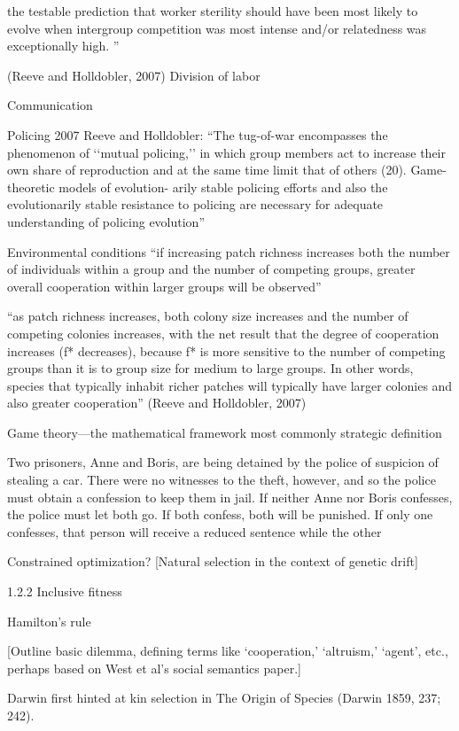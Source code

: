 \documentclass{tufte-book} %
\begin{document}
the testable prediction that worker sterility should have been most likely to evolve when intergroup competition was most intense and/or relatedness was exceptionally high. ”

(Reeve and Holldobler, 2007)
Division of labor

Communication

Policing
2007 Reeve and Holldobler: “The tug-of-war encompasses the phenomenon of ‘‘mutual policing,’’ in which group members act to increase their own share of reproduction and at the same time limit that of others (20). Game-theoretic models of evolution- arily stable policing efforts and also the evolutionarily stable resistance to policing are necessary for adequate understanding of policing evolution”

Environmental conditions
“if increasing patch richness increases both the number of individuals within a group and the number of competing groups, greater overall cooperation within larger groups will be observed”

“as patch richness increases, both colony size increases and the number of competing colonies increases, with the net result that the degree of cooperation increases (f* decreases), because f* is more sensitive to the number of competing groups than it is to group size for medium to large groups. In other words, species that typically inhabit richer patches will typically have larger colonies and also greater cooperation” (Reeve and Holldobler, 2007)



Game theory—the mathematical framework most commonly  strategic definition 

Two prisoners, Anne and Boris, are being detained by the police of suspicion of stealing a car. There were no witnesses to the theft, however, and so the police must obtain a confession to keep them in jail. If neither Anne nor Boris confesses, the police must let both go. If both confess, both will be punished. If only one confesses, that person will receive a reduced sentence while the other

Constrained optimization? [Natural selection in the context of genetic drift]

1.2.2 Inclusive fitness

Hamilton’s rule 

[Outline basic dilemma, defining terms like ‘cooperation,’ ‘altruism,’ ‘agent’, etc., perhaps based on West et al’s social semantics paper.]

Darwin first hinted at kin selection in The Origin of Species (Darwin 1859, 237; 242).
\end{document}

